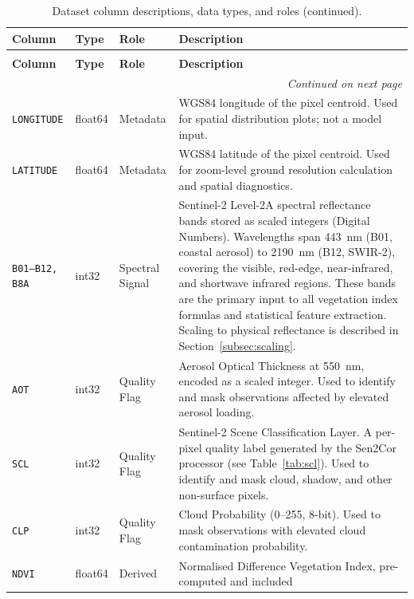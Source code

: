 \begin{longtable}{@{}p{2.6cm}p{1.4cm}p{1.6cm}p{7.4cm}@{}}
\caption{Dataset column descriptions, data types, and roles.}
\label{tab:columns}\\
\toprule
\textbf{Column} & \textbf{Type} & \textbf{Role} & \textbf{Description} \\
\midrule
\endfirsthead
\caption[]{Dataset column descriptions, data types, and roles (continued).}\\
\toprule
\textbf{Column} & \textbf{Type} & \textbf{Role} & \textbf{Description} \\
\midrule
\endhead
\midrule
\multicolumn{4}{r}{\textit{Continued on next page}}\\
\endfoot
\bottomrule
\endlastfoot
\texttt{LONGITUDE} & float64 & Metadata &
    WGS84 longitude of the pixel centroid. Used for spatial distribution
    plots; not a model input. \\
\addlinespace
\texttt{LATITUDE} & float64 & Metadata &
    WGS84 latitude of the pixel centroid. Used for zoom-level ground
    resolution calculation and spatial diagnostics. \\
\addlinespace
\texttt{B01--B12, B8A}
    & int32 & Spectral Signal &
    Sentinel-2 Level-2A spectral reflectance bands stored as scaled
    integers (Digital Numbers). Wavelengths span 443~nm (B01, coastal
    aerosol) to 2190~nm (B12, SWIR-2), covering the visible, red-edge,
    near-infrared, and shortwave infrared regions. These bands are the
    primary input to all vegetation index formulas and statistical feature
    extraction. Scaling to physical reflectance is described in
    Section~\ref{subsec:scaling}. \\
\addlinespace
\texttt{AOT} & int32 & Quality Flag &
    Aerosol Optical Thickness at 550~nm, encoded as a scaled integer.
    Used to identify and mask observations affected by elevated aerosol
    loading. \\
\addlinespace
\texttt{SCL} & int32 & Quality Flag &
    Sentinel-2 Scene Classification Layer. A per-pixel quality label
    generated by the Sen2Cor processor (see Table~\ref{tab:scl}).
    Used to identify and mask cloud, shadow, and other non-surface pixels. \\
\addlinespace
\texttt{CLP} & int32 & Quality Flag &
    Cloud Probability (0--255, 8-bit). Used to mask observations with
    elevated cloud contamination probability. \\
\addlinespace
\texttt{NDVI} & float64 & Derived &
    Normalised Difference Vegetation Index, pre-computed and included

\end{longtable}
